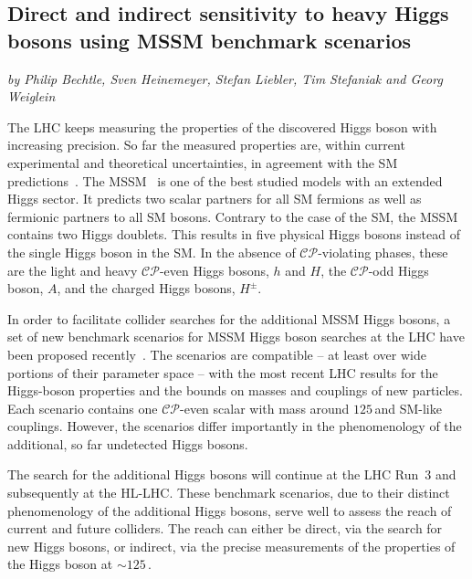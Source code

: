 \subsection{Direct and indirect sensitivity to heavy Higgs bosons using MSSM benchmark scenarios}\label{Sec:9.5}
\begin{center}
\textit{by Philip Bechtle, Sven Heinemeyer, Stefan Liebler, Tim Stefaniak and Georg Weiglein}
\end{center}


The LHC keeps measuring the properties of the discovered Higgs boson with increasing precision. So far the measured properties are, within current experimental and theoretical uncertainties, in agreement with the SM predictions~\cite{Khachatryan:2016vau}. The MSSM~\cite{Nilles:1983ge,Haber:1984rc,Gunion:1984yn} is one of the best studied models with an extended Higgs sector. It predicts two scalar partners for all SM fermions as well as fermionic partners to all SM bosons. Contrary to the case of the SM, the MSSM contains two Higgs doublets.
This results in five physical Higgs bosons instead of the single Higgs boson in the SM. In the absence of $\mathcal{CP}$-violating phases, these are the light and heavy $\mathcal{CP}$-even Higgs bosons,  
$h$ and $H$, the $\mathcal{CP}$-odd Higgs boson, $A$, and the charged Higgs bosons, $H^\pm$.

In order to facilitate collider searches for the additional MSSM Higgs bosons, a set of new benchmark scenarios for MSSM Higgs boson searches at the LHC have been proposed recently~\cite{Bahl:2018zmf}. The scenarios are compatible -- at least over wide portions
of their parameter space -- with the most recent LHC results for the
Higgs-boson properties and the bounds on masses and couplings of new
particles. Each scenario contains one $\mathcal{CP}$-even scalar with mass around $125$\,\UGeV and SM-like couplings. However, the scenarios differ importantly in the phenomenology of the additional, so far undetected Higgs bosons.

The search for the additional Higgs bosons will continue at the LHC
Run~3 and subsequently at the HL-LHC. These benchmark scenarios, due to their distinct phenomenology of the additional Higgs bosons, serve well to assess the reach of current and future colliders. The reach can either be direct, via the search for new Higgs bosons, or indirect, via the precise measurements of the properties of the Higgs boson at $\sim 125$\,\UGeV. 

